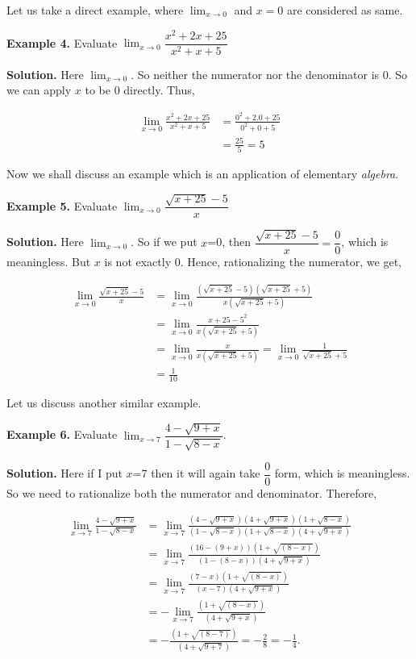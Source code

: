 \documentclass[../../main.tex]{subfiles}
\begin{document}
Let us take a direct example, where $\lim_{x \rightarrow 0}$ and $x=0$ are considered as same.

\vspace{0.2cm}
\textbf{Example 4.}
\vspace{0.2cm}
Evaluate $\lim_{x \rightarrow 0}\dfrac{x^2+2x+25}{x^2+x+5}$

\textbf{Solution.} Here $\lim_{x \rightarrow 0}$. So neither the numerator nor the denominator is $0$.
So we can apply $x$ to be $0$ directly. Thus,

\begin{align*}
    \lim_{x \rightarrow 0}\frac{x^2+2x+25}{x^2+x+5} &= \frac{0^2+2.0+25}{0^2+0+5} \\
    &= \frac{25}{5} = 5
\end{align*}

Now we shall discuss an example which is an application of elementary \textit{algebra}.

\vspace{0.2cm}
\textbf{Example 5.} 
\vspace{0.2cm}
Evaluate $\lim_{x \to 0}\dfrac{\sqrt{x+25}-5}{x}$

\textbf{Solution.} Here $\lim_{x \rightarrow 0}$. So if we put $x$=0, then $\dfrac{\sqrt{x+25}-5}{x}=\dfrac{0}{0}$, which is meaningless. But $x$ is not exactly $0$. Hence, rationalizing the numerator, we get,

\begin{align*}
    \lim_{x\to0} \frac{\sqrt{x+25}-5}{x} &= \lim_{x\to0} \frac{(\sqrt{x+25}-5)(\sqrt{x+25}+5)}{x(\sqrt{x+25}+5)} \\ 
    &= \lim_{x\to0} \frac{x+25-5^2}{x(\sqrt{x+25}+5)} \\
    &= \lim_{x\to0} \frac{x}{x(\sqrt{x+25}+5)} = \lim_{x\to0} \frac{1}{\sqrt{x+25}+5} \\
    &= \frac{1}{10}
\end{align*}
      
Let us discuss another similar example.

\vspace{0.2cm}
\textbf{Example 6.}
\vspace{0.2cm}
Evaluate $\lim_{x \rightarrow 7}\dfrac{4-\sqrt{9+x}}{1-\sqrt{8-x}}$.
    
\textbf{Solution.} Here if I put $x$=7 then it will again take $\dfrac{0}{0}$ form, which is meaningless. So we need to rationalize both the numerator and denominator. Therefore,

\begin{align*}
    \lim_{x \rightarrow 7}\frac{4-\sqrt{9+x}}{1-\sqrt{8-x}} &= \lim_{x \rightarrow 7}\frac{(4-\sqrt{9+x})(4+\sqrt{9+x})(1+\sqrt{8-x})}{(1-\sqrt{8-x})(1+\sqrt{8-x})(4+\sqrt{9+x})} \\
    &= \lim_{x \rightarrow 7}\frac{(16-(9+x))(1+\sqrt{(8-x)})}{(1-(8-x))(4+\sqrt{9+x})} \\
    &= \lim_{x \rightarrow 7}\frac{(7-x)(1+\sqrt{(8-x)})}{(x-7)(4+\sqrt{9+x})} \\ 
    &= -\lim_{x \rightarrow 7}\frac{(1+\sqrt{(8-x)})}{(4+\sqrt{9+x})} \\
    &= -\frac{(1+\sqrt{(8-7)})}{(4+\sqrt{9+7})} = -\frac{2}{8}=-\frac{1}{4}.
\end{align*}
\end{document}
